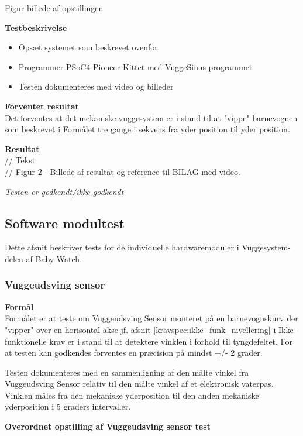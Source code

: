 Figur billede af opstillingen

\textbf{Testbeskrivelse}
\begin{itemize}
	\item Opsæt systemet som beskrevet ovenfor
	\item Programmer PSoC4 Pioneer Kittet med VuggeSinus programmet
	\item Testen dokumenteres med video og billeder
\end{itemize}

\textbf{Forventet resultat} \\
Det forventes at det mekaniske vuggesystem er i stand til at "vippe" barnevognen som beskrevet i Formålet tre gange i sekvens fra yder position til yder position.

\textbf{Resultat} \\
// Tekst \\

// Figur 2 - Billede af resultat og reference til BILAG med video.

\textit{Testen er godkendt/ikke-godkendt}




\subsection{Software modultest}
Dette afsnit beskriver tests for de individuelle hardwaremoduler i Vuggesystem-delen af Baby Watch.
\subsubsection{Vuggeudsving sensor}
\textbf{Formål} \\
Formålet er at teste om Vuggeudsving Sensor monteret på en barnevognskurv der "vipper" over en horisontal akse jf. afsnit \vref{kravspec:ikke_funk_nivellering} i Ikke-funktionelle krav er i stand til at detektere vinklen i forhold til tyngdefeltet. For at testen kan godkendes forventes en præcision på mindst +/- 2 grader.

Testen dokumenteres med en sammenligning af den målte vinkel fra Vuggeudsving Sensor relativ til den målte vinkel af et elektronisk vaterpas. Vinklen måles fra den mekaniske yderposition til den anden mekaniske yderposition i 5 graders intervaller.

\textbf{Overordnet opstilling af Vuggeudsving sensor test}

